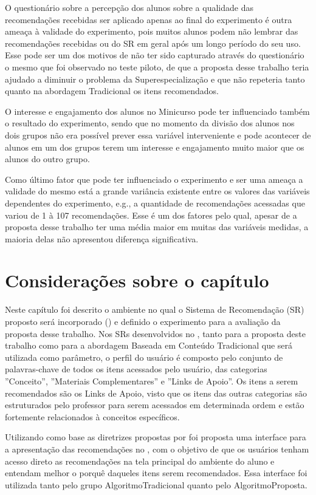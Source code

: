 O questionário sobre a percepção dos alunos sobre a qualidade das recomendações recebidas ser aplicado apenas ao final
do experimento é outra ameaça à validade do experimento, pois muitos alunos podem não lembrar das recomendações recebidas
ou do SR em geral após um longo período do seu uso. Esse pode ser um dos motivos de não ter sido capturado através do
questionário o mesmo que foi observado no teste piloto, de que a proposta desse trabalho teria ajudado a diminuir o
problema da Superespecialização e que não repeteria tanto quanto na abordagem Tradicional os itens recomendados.

O interesse e engajamento dos alunos no Minicurso pode ter influenciado também o resultado do experimento, sendo que no momento
da divisão dos alunos nos dois grupos não era possível prever essa variável interveniente e pode acontecer de alunos em
um dos grupos terem um interesse e engajamento muito maior que os alunos do outro grupo.

Como último fator que pode ter influenciado o experimento e ser uma ameaça a validade do mesmo está a grande variância
existente entre os valores das variáveis dependentes do experimento, e.g., a quantidade de recomendações acessadas que variou
de 1 à 107 recomendações. Esse é um dos fatores pelo qual, apesar de a proposta desse trabalho ter uma média maior em
muitas das variáveis medidas, a maioria delas não apresentou diferença significativa.

\section{Considerações sobre o capítulo}

Neste capítulo foi descrito o ambiente no qual o Sistema de Recomendação (SR) proposto será incorporado (\adaptweb) e definido o
experimento para a avaliação da proposta desse trabalho. Nos SRs desenvolvidos no \adaptweb, tanto para a proposta
deste trabalho como para a abordagem Baseada em Conteúdo Tradicional que será utilizada como parâmetro, o perfil do
usuário é composto pelo conjunto de palavras-chave de todos os itens acessados pelo usuário, das
categorias ''Conceito'', ''Materiais Complementares'' e ''Links de Apoio''. Os itens a serem recomendados são os
Links de Apoio, visto que os itens das outras categorias são estruturados pelo professor para serem acessados em determinada
ordem e estão fortemente relacionados à conceitos específicos.

Utilizando como base as diretrizes propostas por  foi proposta uma interface para a
apresentação das recomendações no \adaptweb, com o objetivo de que os usuários tenham acesso direto as recomendações na
tela principal do ambiente do aluno e entendam melhor o porquê daqueles itens serem recomendados. Essa interface foi
utilizada tanto pelo grupo AlgoritmoTradicional quanto pelo AlgoritmoProposta.

